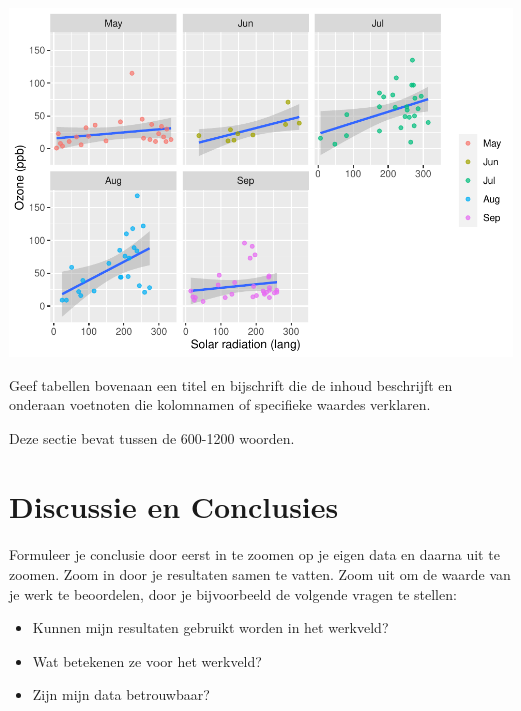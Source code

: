 \documentclass[
]{article}
\providecommand{\tightlist}{%
  \setlength{\itemsep}{0pt}\setlength{\parskip}{0pt}}
\let\origfigure\figure
\let\endorigfigure\endfigure
\renewenvironment{figure}[1][2] {
    \expandafter\origfigure\expandafter[H]
} {
    \endorigfigure
}
\begin{document}
\begin{figure}[!H]
\includegraphics[width=1\linewidth,]{simple_template_files/figure-latex/plot-demo-1} \caption{Ozon concentraties geplot tegen zonlicht intensiteit, vergeleken over verschillende maanden. Lineaire modellen (blauwe lijnen) en confidence intervals (grijze gebieden) zijn hieraan toegevoegd.}\label{fig:plot-demo}
\end{figure}

Geef tabellen bovenaan een titel en bijschrift die de inhoud beschrijft en onderaan voetnoten die kolomnamen of specifieke waardes verklaren.

Deze sectie bevat tussen de 600-1200 woorden.

\hypertarget{discussie-en-conclusies}{%
\section{Discussie en Conclusies}\label{discussie-en-conclusies}}

Formuleer je conclusie door eerst in te zoomen op je eigen data en daarna uit te zoomen. Zoom in door je resultaten samen te vatten. Zoom uit om de waarde van je werk te beoordelen, door je bijvoorbeeld de volgende vragen te stellen:

\begin{itemize}
\tightlist
\item
  Kunnen mijn resultaten gebruikt worden in het werkveld?
\item
  Wat betekenen ze voor het werkveld?
\item
  Zijn mijn data betrouwbaar?
\end{itemize}
\end{document}
